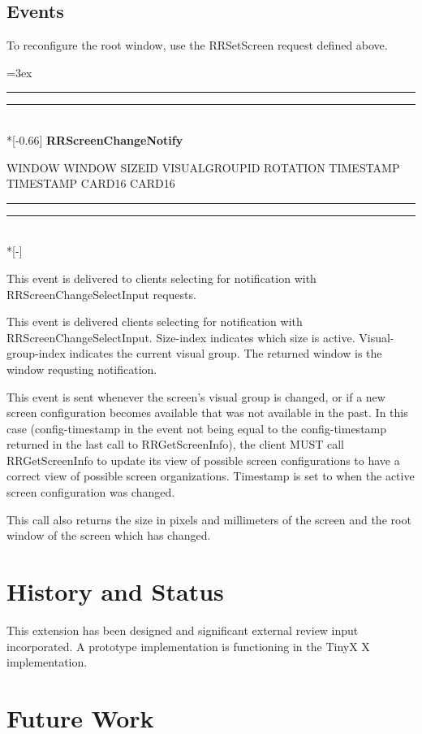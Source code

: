 \documentclass[twocolumn]{article}
\newlength{\croplength}
\newlength{\cropweight}
\newenvironment{Xrequest}[1]{%
  \croplength=3ex
  \hspace*{1.5\croplength}\begin{minipage}{\textwidth}
  \cropweight=0.25pt
  \hspace*{-1.5\croplength}%
  \rule[-\croplength]{\cropweight}{\croplength}%
  \rule[-\cropweight]{\croplength}{\cropweight}\\*[-0.66\croplength]%
  \textbf{#1}%
  \begin{list}{}{%
    \renewcommand{\makelabel}[1]{{##1:~}}%
    \newcommand{\Xparam}[1]{\item[\textit{##1}]}
    \newcommand{\Xreply}{\\\hspace*{-\leftmargin}$\rightarrow$}
    \newcommand{\Xerror}[1]{\vspace{5pt}\item[Errors] \texttt{##1}}
    \labelwidth=0pt
    \labelsep=0pt
    \parsep=0pt
    \itemsep=0pt
    \listparindent=0pt
  }}
  {\end{list}%
  \vspace{-\baselineskip}%
  \hspace*{-1.5\croplength}%
  \rule[\croplength]{\cropweight}{\croplength}%
  \rule[\croplength]{\croplength}{\cropweight}\\*[-\croplength]%
  \end{minipage}\vspace*{-\baselineskip}}
\begin{document}
\subsection{Events}

To reconfigure the root window, use the RRSetScreen request defined
above.

\begin{Xrequest}{RRScreenChangeNotify}
 WINDOW
 WINDOW
 SIZEID
 VISUALGROUPID
 ROTATION
 TIMESTAMP
 TIMESTAMP
 CARD16
 CARD16
\end{Xrequest}

This event is delivered to clients selecting for notification with
RRScreenChangeSelectInput requests.

This event is delivered clients selecting for notification with
RRScreenChangeSelectInput.   Size-index indicates which size is active.
Visual-group-index indicates the current visual group.  The returned
window is the window requsting notification.

This event is sent whenever the screen's visual group is changed, or
if a new screen configuration becomes available that was not available
in the past.  In this case (config-timestamp in the event not being
equal to the config-timestamp returned in the last call to
RRGetScreenInfo), the client MUST call RRGetScreenInfo to update its
view of possible screen configurations to have a correct view of
possible screen organizations. Timestamp is set to when the active
screen configuration was changed.

This call also returns the size in pixels and millimeters of the
screen and the root window of the screen which has changed.

\section{History and Status}

This extension has been designed and significant external review input
incorporated. A prototype implementation is functioning in the TinyX X
implementation.\cite{tinyx}


\section{Future Work}
\end{document}
